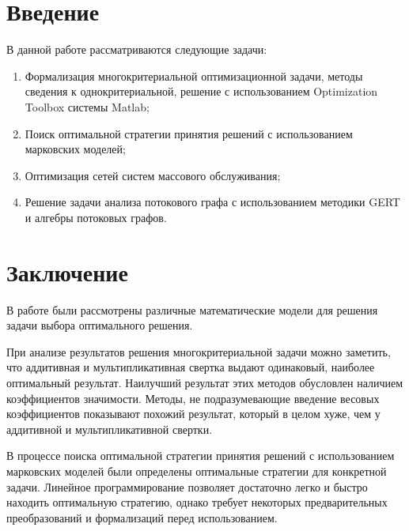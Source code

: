 


%
\tableofcontents
\clearpage

%

\chapter*{Введение}
В данной работе рассматриваются следующие задачи:
\begin{enumerate}
\item Формализация многокритериальной оптимизационной задачи, методы сведения к однокритериальной, решение с использованием Optimization Toolbox системы Matlab;
\item Поиск оптимальной стратегии принятия решений с использованием марковских моделей;
\item Оптимизация сетей систем массового обслуживания;
\item Решение задачи анализа потокового графа с использованием методики GERT и алгебры потоковых графов.
\end{enumerate}






\chapter*{Заключение}
В работе были рассмотрены различные математические модели для решения задачи выбора оптимального решения.

При анализе результатов решения многокритериальной задачи можно заметить, что аддитивная и мультипликативная свертка выдают одинаковый, наиболее оптимальный результат. Наилучший результат этих методов обусловлен наличием коэффициентов значимости. Методы, не подразумевающие введение весовых коэффициентов показывают похожий результат, который в целом хуже, чем у аддитивной и мультипликативной свертки.

В процессе поиска оптимальной стратегии принятия решений с использованием марковских моделей были определены оптимальные стратегии для конкретной задачи. Линейное программирование позволяет достаточно легко и быстро находить оптимальную стратегию, однако требует некоторых предварительных преобразований и формализаций перед использованием.


